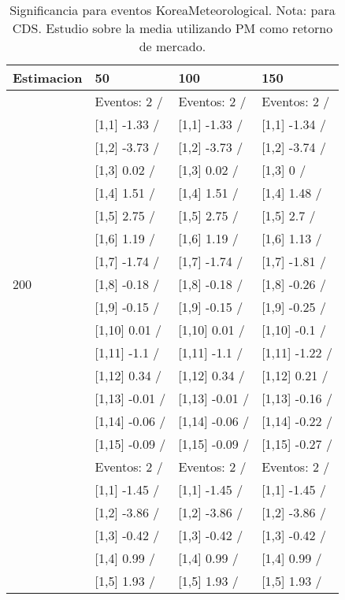 \begin{table}

\caption{Significancia para eventos KoreaMeteorological. Nota: para CDS. Estudio sobre la media utilizando PM como retorno de mercado.}
\centering
\begin{tabular}[t]{llll}
\toprule
Estimacion & 50 & 100 & 150\\
\midrule
 & Eventos:  2 / & Eventos:  2 / & Eventos:  2 /\\
 & {}[1,1] -1.33  / & {}[1,1] -1.33  / & {}[1,1] -1.34  /\\
 & {}[1,2] -3.73  / & {}[1,2] -3.73  / & {}[1,2] -3.74  /\\
 & {}[1,3] 0.02  / & {}[1,3] 0.02  / & {}[1,3] 0  /\\
 & {}[1,4] 1.51  / & {}[1,4] 1.51  / & {}[1,4] 1.48  /\\
\addlinespace
 & {}[1,5] 2.75  / & {}[1,5] 2.75  / & {}[1,5] 2.7  /\\
 & {}[1,6] 1.19  / & {}[1,6] 1.19  / & {}[1,6] 1.13  /\\
 & {}[1,7] -1.74  / & {}[1,7] -1.74  / & {}[1,7] -1.81  /\\
200 & {}[1,8] -0.18  / & {}[1,8] -0.18  / & {}[1,8] -0.26  /\\
 & {}[1,9] -0.15  / & {}[1,9] -0.15  / & {}[1,9] -0.25  /\\
\addlinespace
 & {}[1,10] 0.01  / & {}[1,10] 0.01  / & {}[1,10] -0.1  /\\
 & {}[1,11] -1.1  / & {}[1,11] -1.1  / & {}[1,11] -1.22  /\\
 & {}[1,12] 0.34  / & {}[1,12] 0.34  / & {}[1,12] 0.21  /\\
 & {}[1,13] -0.01  / & {}[1,13] -0.01  / & {}[1,13] -0.16  /\\
 & {}[1,14] -0.06  / & {}[1,14] -0.06  / & {}[1,14] -0.22  /\\
\addlinespace
 & {}[1,15] -0.09  / & {}[1,15] -0.09  / & {}[1,15] -0.27  /\\
 & Eventos:  2 / & Eventos:  2 / & Eventos:  2 /\\
 & {}[1,1] -1.45  / & {}[1,1] -1.45  / & {}[1,1] -1.45  /\\
 & {}[1,2] -3.86  / & {}[1,2] -3.86  / & {}[1,2] -3.86  /\\
 & {}[1,3] -0.42  / & {}[1,3] -0.42  / & {}[1,3] -0.42  /\\
\addlinespace
 & {}[1,4] 0.99  / & {}[1,4] 0.99  / & {}[1,4] 0.99  /\\
 & {}[1,5] 1.93  / & {}[1,5] 1.93  / & {}[1,5] 1.93  /\\

\end{tabular}
\end{table}
